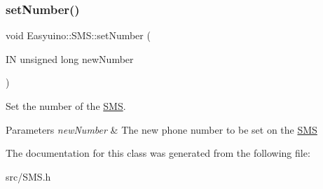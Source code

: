 \subsubsection{\texorpdfstring{set\+Number()}{setNumber()}}
{\footnotesize\ttfamily void Easyuino\+::\+S\+M\+S\+::set\+Number (\begin{DoxyParamCaption}\item[{IN unsigned long}]{new\+Number }\end{DoxyParamCaption})}



Set the number of the \hyperlink{class_easyuino_1_1_s_m_s}{S\+MS}. 


\begin{DoxyParams}{Parameters}
{\em new\+Number} & The new phone number to be set on the \hyperlink{class_easyuino_1_1_s_m_s}{S\+MS} \\
\hline
\end{DoxyParams}


The documentation for this class was generated from the following file\+:\begin{DoxyCompactItemize}
\item 
src/S\+M\+S.\+h\end{DoxyCompactItemize}
